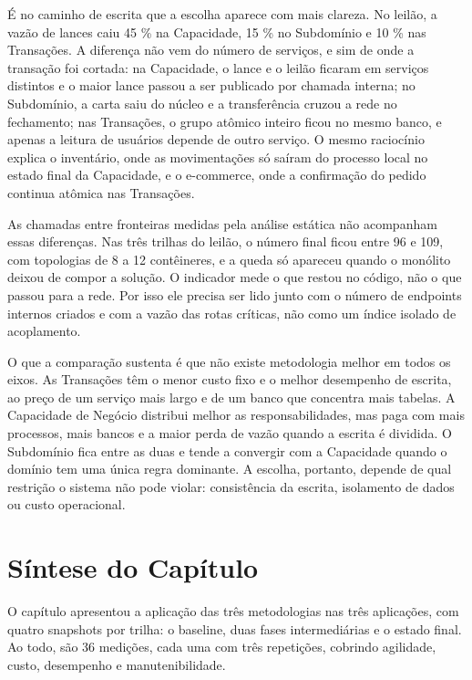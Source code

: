 É no caminho de escrita que a escolha aparece com mais clareza. No leilão, a vazão de lances caiu 45 \% na Capacidade, 15 \% no Subdomínio e 10 \% nas Transações. A diferença não vem do número de serviços, e sim de onde a transação foi cortada: na Capacidade, o lance e o leilão ficaram em serviços distintos e o maior lance passou a ser publicado por chamada interna; no Subdomínio, a carta saiu do núcleo e a transferência cruzou a rede no fechamento; nas Transações, o grupo atômico inteiro ficou no mesmo banco, e apenas a leitura de usuários depende de outro serviço. O mesmo raciocínio explica o inventário, onde as movimentações só saíram do processo local no estado final da Capacidade, e o e-commerce, onde a confirmação do pedido continua atômica nas Transações.

As chamadas entre fronteiras medidas pela análise estática não acompanham essas diferenças. Nas três trilhas do leilão, o número final ficou entre 96 e 109, com topologias de 8 a 12 contêineres, e a queda só apareceu quando o monólito deixou de compor a solução. O indicador mede o que restou no código, não o que passou para a rede. Por isso ele precisa ser lido junto com o número de endpoints internos criados e com a vazão das rotas críticas, não como um índice isolado de acoplamento.

O que a comparação sustenta é que não existe metodologia melhor em todos os eixos. As Transações têm o menor custo fixo e o melhor desempenho de escrita, ao preço de um serviço mais largo e de um banco que concentra mais tabelas. A Capacidade de Negócio distribui melhor as responsabilidades, mas paga com mais processos, mais bancos e a maior perda de vazão quando a escrita é dividida. O Subdomínio fica entre as duas e tende a convergir com a Capacidade quando o domínio tem uma única regra dominante. A escolha, portanto, depende de qual restrição o sistema não pode violar: consistência da escrita, isolamento de dados ou custo operacional.


\section{Síntese do Capítulo}
\label{sec:sintese_capitulo}

O capítulo apresentou a aplicação das três metodologias nas três aplicações, com quatro snapshots por trilha: o baseline, duas fases intermediárias e o estado final. Ao todo, são 36 medições, cada uma com três repetições, cobrindo agilidade, custo, desempenho e manutenibilidade.

